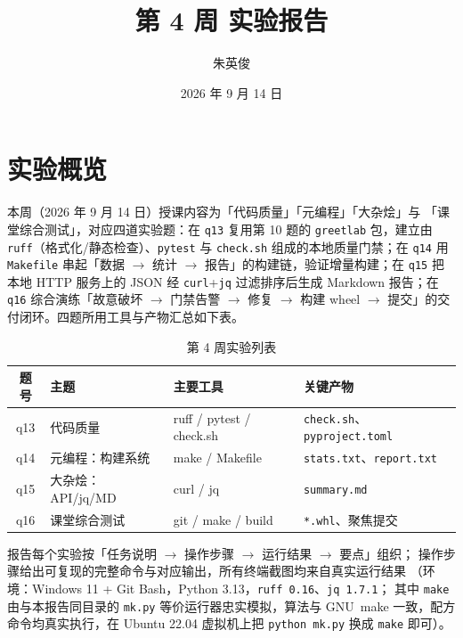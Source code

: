 \documentclass{hamesome-report}
\title{第 4 周 实验报告}
\author{朱英俊}
\date{2026 年 9 月 14 日}
\begin{document}
\maketitle
\tableofcontents
\vspace{0.3cm}

\section{实验概览}
本周（2026 年 9 月 14 日）授课内容为「代码质量」「元编程」「大杂烩」与
「课堂综合测试」，对应四道实验题：在 \texttt{q13} 复用第 10 题的
\texttt{greetlab} 包，建立由 \texttt{ruff}（格式化/静态检查）、\texttt{pytest}
与 \texttt{check.sh} 组成的本地质量门禁；在 \texttt{q14} 用 \texttt{Makefile}
串起「数据 $\to$ 统计 $\to$ 报告」的构建链，验证增量构建；在 \texttt{q15}
把本地 HTTP 服务上的 JSON 经 \texttt{curl}+\texttt{jq} 过滤排序后生成
Markdown 报告；在 \texttt{q16} 综合演练「故意破坏 $\to$ 门禁告警 $\to$ 修复
$\to$ 构建 wheel $\to$ 提交」的交付闭环。四题所用工具与产物汇总如下表。

\begin{table}[H]
\centering
\caption{第 4 周实验列表}
\label{tab:overview}
\begin{tabular}{|c|l|l|l|}
\hline
题号 & 主题 & 主要工具 & 关键产物 \\
\hline
q13 & 代码质量 & ruff / pytest / check.sh & \texttt{check.sh}、\texttt{pyproject.toml} \\
q14 & 元编程：构建系统 & make / Makefile & \texttt{stats.txt}、\texttt{report.txt} \\
q15 & 大杂烩：API/jq/MD & curl / jq & \texttt{summary.md} \\
q16 & 课堂综合测试 & git / make / build & \texttt{*.whl}、聚焦提交 \\
\hline
\end{tabular}
\end{table}

报告每个实验按「任务说明 $\to$ 操作步骤 $\to$ 运行结果 $\to$ 要点」组织；
操作步骤给出可复现的完整命令与对应输出，所有终端截图均来自真实运行结果
（环境：Windows 11 + Git Bash，Python 3.13，\texttt{ruff\ 0.16}、\texttt{jq\ 1.7.1}；
其中 \texttt{make} 由与本报告同目录的 \texttt{mk.py} 等价运行器忠实模拟，算法与
GNU~make 一致，配方命令均真实执行，在 Ubuntu 22.04 虚拟机上把 \texttt{python\ mk.py}
换成 \texttt{make} 即可）。

\end{document}
